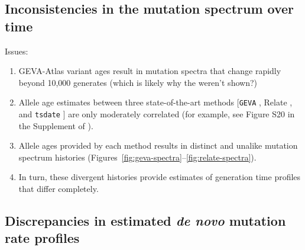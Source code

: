 \documentclass[]{article}
\begin{document}
\subsection*{Inconsistencies in the mutation spectrum over time}

Issues:
\begin{enumerate}
    \item GEVA-Atlas variant ages result in mutation spectra that change
        rapidly beyond 10,000 generates (which is likely why the weren't
        shown?)
    \item Allele age estimates between three state-of-the-art methods
        [\texttt{GEVA} \citep{albers2020dating}, Relate
        \citep{speidel2019method}, and \texttt{tsdate}
        \citep{wohns2022unified}] are only moderately correlated
        (for example, see Figure S20 in the Supplement of
        \citet{wohns2022unified}).
    \item Allele ages provided by each method results in distinct and
        unalike mutation spectrum histories
        (Figures~\ref{fig:geva-spectra}--\ref{fig:relate-spectra}).
    \item In turn, these divergent histories provide estimates of
        generation time profiles that differ completely.
\end{enumerate}

\subsection*{Discrepancies in estimated \emph{de novo} mutation rate profiles}
\end{document}
